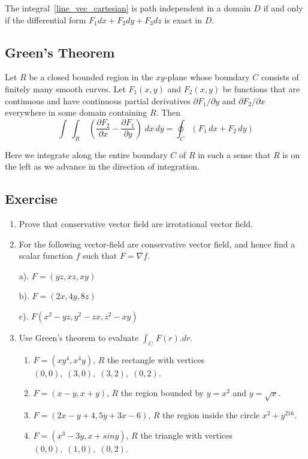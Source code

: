 \documentclass[aima331_lecturenotes_ku.tex]{subfiles}
\begin{document}
\begin{theorem}
  The integral~\ref{line_vec_cartesian} is path independent in a domain $D$ if and only if the differential form $F_1dx + F_2dy + F_3dz$ is exact in $D$.
\end{theorem}

\subsection{Green's Theorem}
\begin{mdframed}
  Let $R$ be a closed bounded region in the $xy$-plane whose boundary $C$ consists of finitely many smooth curves. Let $F_1(x,y)$ and $F_2(x,y)$ be functions that are continuous and have continuous partial derivatives $\partial F_1 /\partial y$ and $\partial F_2 /\partial x$ everywhere in some domain containing $R$. Then
  \begin{equation}
    \label{green}
    \int \, \int _R \; \left ( \frac{\partial F_2}{\partial x} - \frac{\partial F_1}{\partial y}  \right )\;dx\,dy = \oint_C (F_1\,dx + F_2 \, dy)
  \end{equation}
\end{mdframed}
Here we integrate along the entire boundary $C$ of $R$ in such a sense that $R$ is on the left as we advance in the direction of integration.

\subsection{Exercise}
\begin{enumerate}
\item Prove that conservative vector field are irrotational vector field.
\item For the following vector-field are conservative vector field, and hence find a scalar function $f$ such that $F=\nabla f$.
  \begin{multicols}{3}
    a). $F=(yz,xz,xy)$
    \columnbreak

    b). $F=(2x,4y,8z)$
    \columnbreak

    c). $F(x^2-yz, y^2-zx, z^2-xy)$

  \end{multicols}
\item Use Green's theorem to evaluate $\int_C\, F(r).dr$.
  \begin{enumerate}
  \item $F=(xy^4,x^4y)$, $R$ the rectangle with vertices $(0,0), \; (3,0), \; (3,2), \; (0,2)$.
  \item $F=(x-y,x+y)$, $R$ the region bounded by $y=x^2$ and $y=\sqrt{x}$.
  \item $F=(2x-y+4,5y+3x-6)$, $R$ the region inside the circle $x^2+y^216$.
   \item $F=(x^3-3y,x+siny)$, $R$ the triangle with vertices $(0,0), \; (1,0), \; (0,2)$.
  \end{enumerate}
\end{enumerate}
\end{document}

